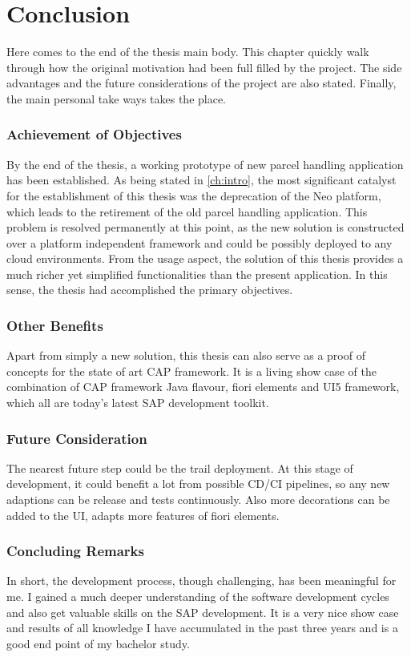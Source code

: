 \chapter*{Conclusion}
\label{ch:sum}


Here comes to the end of the thesis main body.
This chapter quickly walk through how the original motivation had been full filled by the project. The side advantages and the future considerations of the project are also stated. Finally, the main personal take ways takes the place.

\subsection{Achievement of Objectives}
By the end of the thesis, a working prototype of new parcel handling application has been established.
As being stated in \autoref{ch:intro}, the most significant catalyst for the establishment of this thesis was the deprecation of the Neo platform, which leads to the retirement of the old parcel handling application. This problem is resolved permanently at this point, as the new solution is constructed over a platform independent framework and could be possibly deployed to any cloud environments. From the usage aspect, the solution of this thesis provides a much richer yet simplified functionalities than the present application. In this sense, the thesis had accomplished the primary objectives.

\subsection{Other Benefits}
Apart from simply a new solution, this thesis can also serve as a proof of concepts for the state of art CAP framework. It is a living show case of the combination of CAP framework Java flavour, fiori elements and UI5 framework, which all are today's latest SAP development toolkit. 

\subsection{Future Consideration}
The nearest future step could be the trail deployment. At this stage of development, it could benefit a lot from possible CD/CI pipelines, so any new adaptions can be release and tests continuously. Also more decorations can be added to the UI, adapts more features of fiori elements.

\subsection{Concluding Remarks}
In short, the development process, though challenging, has been meaningful for me. I gained a much deeper understanding of the software development cycles and also get valuable skills on the SAP development. It is a very nice show case and results of all knowledge I have accumulated in the past three years and is a good end point of my bachelor study.
